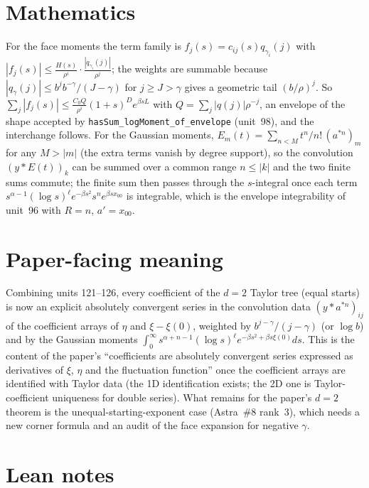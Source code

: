 \documentclass[11pt]{article}
\begin{document}
\section{Mathematics}

For the face moments the term family is $f_j(s)=c_{ij}(s)q_{\gamma_i}(j)$ with
$|f_j(s)|\le\frac{H(s)}{\rho^i}\cdot\frac{|q_{\gamma_i}(j)|}{\rho^j}$; the weights are summable because
$|q_\gamma(j)|\le b^jb^{-\gamma}/(J-\gamma)$ for $j\ge J>\gamma$ gives a geometric tail
$(b/\rho)^j$. So $\sum_j|f_j(s)|\le\frac{C_0Q}{\rho^i}(1+s)^De^{\beta sL}$ with $Q=\sum_j|q(j)|\rho^{-j}$,
an envelope of the shape accepted by \texttt{hasSum\_logMoment\_of\_envelope} (unit~98), and the
interchange follows. For the Gaussian moments, $E_m(t)=\sum_{n<M}t^n/n!\,(a^{*n})_m$ for any
$M>|m|$ (the extra terms vanish by degree support), so the convolution $(y*E(t))_k$ can be summed
over a common range $n\le|k|$ and the two finite sums commute; the finite sum then passes through
the $s$-integral once each term $s^{\alpha-1}(\log s)^\ell e^{-\beta s^2}s^ne^{\beta sx_{00}}$ is
integrable, which is the envelope integrability of unit~96 with $R=n$, $a'=x_{00}$.

\section{Paper-facing meaning}

Combining units 121--126, every coefficient of the $d=2$ Taylor tree (equal starts) is now an
explicit absolutely convergent series in the convolution data $(y*a^{*n})_{ij}$ of the coefficient
arrays of $\eta$ and $\xi-\xi(0)$, weighted by $b^{j-\gamma}/(j-\gamma)$ (or $\log b$) and by the
Gaussian moments $\int_0^\infty s^{\alpha+n-1}(\log s)^\ell e^{-\beta s^2+\beta s\xi(0)}ds$. This is the
content of the paper's ``coefficients are absolutely convergent series expressed as derivatives of
$\xi$, $\eta$ and the fluctuation function'' once the coefficient arrays are identified with Taylor
data (the 1D identification exists; the 2D one is Taylor-coefficient uniqueness for double series).
What remains for the paper's $d=2$ theorem is the unequal-starting-exponent case (Astra~\#8
rank~3), which needs a new corner formula and an audit of the face expansion for negative $\gamma$.

\section{Lean notes}
\end{document}
